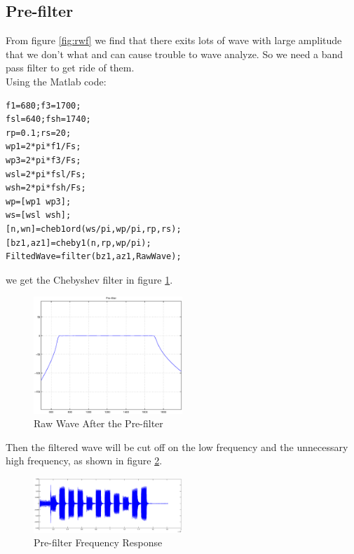 \documentclass[journal]{./sty/IEEEtran}
\let\MYoriglatexcaption\caption
\renewcommand{\caption}[2][\relax]{\MYoriglatexcaption[#2]{#2}}
\begin{document}
\subsection{Pre-filter}
From figure \ref{fig:rwf} we find that there exits lots of wave with large amplitude that we don't what and can cause trouble to wave analyze. So we need a band pass filter to get ride of them.\\
\indent Using the Matlab code:
\begin{lstlisting}
f1=680;f3=1700;
fsl=640;fsh=1740;
rp=0.1;rs=20;
wp1=2*pi*f1/Fs;
wp3=2*pi*f3/Fs;
wsl=2*pi*fsl/Fs;
wsh=2*pi*fsh/Fs;
wp=[wp1 wp3];
ws=[wsl wsh];
[n,wn]=cheb1ord(ws/pi,wp/pi,rp,rs);
[bz1,az1]=cheby1(n,rp,wp/pi);
FiltedWave=filter(bz1,az1,RawWave);
\end{lstlisting}
we get the Chebyshev filter in figure \ref{fig:pft}. 
 \begin{figure}[!t]
\centering
\includegraphics[width=0.5\textwidth]{./pic/pre_filter.eps}
\caption{Raw Wave After the Pre-filter}\label{fig:pft}
\end{figure}
Then the filtered wave will be cut off on the low frequency and the unnecessary high frequency, as shown in figure \ref{fig:ftw}.
 \begin{figure}[!t]
\centering
\includegraphics[width=0.5\textwidth]{./pic/FiltedWave.eps}
\caption{Pre-filter Frequency Response}\label{fig:ftw}
\end{figure}
\end{document}
